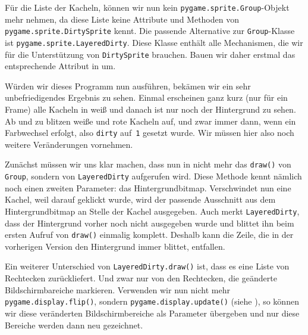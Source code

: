 Für die Liste der Kacheln, können wir nun kein \texttt{pygame.sprite.Group}-Objekt mehr nehmen, da diese Liste keine Attribute und Methoden von \texttt{pygame.sprite.DirtySprite} kennt. Die passende Alternative zur \texttt{Group}-Klasse ist \texttt{pygame.sprite.LayeredDirty}. Diese Klasse enthält alle Mechanismen, die wir für die Unterstützung von \texttt{DirtySprite} brauchen. Bauen wir daher erstmal das entsprechende Attribut in  um.


Würden wir dieses Programm nun ausführen, bekämen wir ein sehr unbefriedigendes Ergebnis zu sehen. Einmal erscheinen ganz kurz (nur für ein Frame) alle Kacheln in weiß und danach ist nur noch der Hintergrund zu sehen. Ab und zu blitzen weiße und rote Kacheln auf, und zwar immer dann, wenn ein Farbwechsel erfolgt, also \texttt{dirty} auf~\texttt{1} gesetzt wurde. Wir müssen hier also noch weitere Veränderungen vornehmen. 

Zunächst müssen wir uns klar machen, dass nun in  nicht mehr das \texttt{draw()} von \texttt{Group}, sondern von \texttt{LayeredDirty} aufgerufen wird. Diese Methode kennt nämlich noch einen zweiten Parameter: das Hintergrundbitmap. Verschwindet nun eine Kachel, weil darauf geklickt wurde, wird der passende Ausschnitt aus dem Hintergrundbitmap an Stelle der Kachel ausgegeben. Auch merkt \texttt{LayeredDirty}, dass der Hintergrund vorher noch nicht ausgegeben wurde und blittet ihn beim ersten Aufruf von \texttt{draw()} einmalig komplett. Deshalb kann die Zeile, die in der vorherigen Version den Hintergrund immer blittet, entfallen.

Ein weiterer Unterschied von \texttt{LayeredDirty.draw()} ist, dass es eine Liste von Rechtecken zurückliefert. Und zwar nur von den Rechtecken, die geänderte Bildschirmbareiche markieren. Verwenden wir nun nicht mehr \texttt{pygame.display.flip()}, sondern \texttt{pygame.display.update()} (siehe ), so können wir diese veränderten Bildschirmbereiche als Parameter übergeben und nur diese Bereiche werden dann neu gezeichnet.

